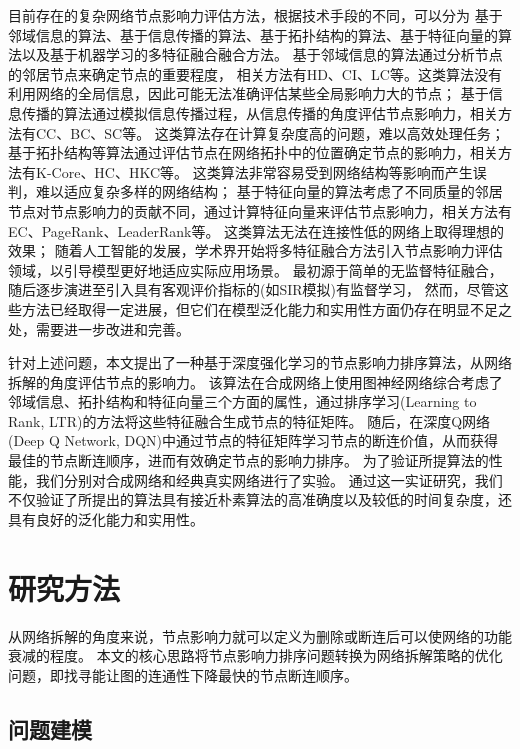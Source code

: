 \documentclass[twocolumn]{morningstar}
\begin{document}
目前存在的复杂网络节点影响力评估方法，根据技术手段的不同，可以分为
基于邻域信息的算法、基于信息传播的算法、基于拓扑结构的算法、基于特征向量的算法以及基于机器学习的多特征融合融合方法。
基于邻域信息的算法通过分析节点的邻居节点来确定节点的重要程度，
相关方法有HD、CI\cite{morone2015CI}、LC\cite{chen2012LC}等。这类算法没有利用网络的全局信息，因此可能无法准确评估某些全局影响力大的节点；
基于信息传播的算法通过模拟信息传播过程，从信息传播的角度评估节点影响力，相关方法有CC、BC、SC等。
这类算法存在计算复杂度高的问题，难以高效处理任务\cite{barabasi2016网络科学书}；
基于拓扑结构等算法通过评估节点在网络拓扑中的位置确定节点的影响力，相关方法有K-Core\cite{gao2022K-Core}、HC\cite{lu2016H-Index}、HKC\cite{zareie2018HKC}等。
这类算法非常容易受到网络结构等影响而产生误判，难以适应复杂多样的网络结构；
基于特征向量的算法考虑了不同质量的邻居节点对节点影响力的贡献不同，通过计算特征向量来评估节点影响力，相关方法有EC、PageRank、LeaderRank等。
这类算法无法在连接性低的网络上取得理想的效果；
随着人工智能的发展，学术界开始将多特征融合方法引入节点影响力评估领域，以引导模型更好地适应实际应用场景。
最初源于简单的无监督特征融合\cite{asgharian2023无监督特征融合_1}，随后逐步演进至引入具有客观评价指标的(如SIR模拟)有监督学习\cite{杨洋2023有监督SIR模拟}，
然而，尽管这些方法已经取得一定进展，但它们在模型泛化能力和实用性方面仍存在明显不足之处，需要进一步改进和完善。


针对上述问题，本文提出了一种基于深度强化学习的节点影响力排序算法，从网络拆解的角度评估节点的影响力。
该算法在合成网络上使用图神经网络综合考虑了邻域信息、拓扑结构和特征向量三个方面的属性，通过排序学习(Learning to Rank, LTR)\cite{li2023LTR}的方法将这些特征融合生成节点的特征矩阵。
随后，在深度Q网络(Deep Q Network, DQN)\cite{hessel2017DQN_1}中通过节点的特征矩阵学习节点的断连价值，从而获得最佳的节点断连顺序，进而有效确定节点的影响力排序。
为了验证所提算法的性能，我们分别对合成网络和经典真实网络进行了实验。
通过这一实证研究，我们不仅验证了所提出的算法具有接近朴素算法的高准确度以及较低的时间复杂度，还具有良好的泛化能力和实用性。


\section{研究方法}\label{sec:Methods}

从网络拆解的角度来说，节点影响力就可以定义为删除或断连后可以使网络的功能衰减的程度\cite{李天梅2019复杂网络的关键节点识别}。
本文的核心思路将节点影响力排序问题转换为网络拆解策略的优化问题，即找寻能让图的连通性下降最快的节点断连顺序。

\subsection{问题建模}\label{sec:ProblemFormulation}
\end{document}
